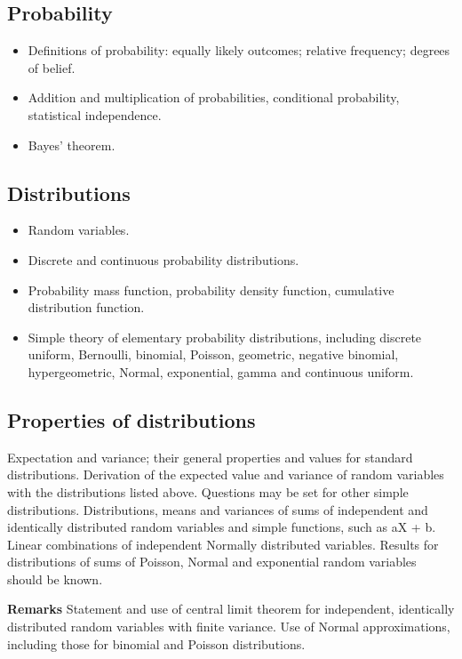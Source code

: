 \subsection*{Probability}
\begin{itemize}
\item Definitions of probability: equally likely outcomes; relative frequency; degrees of belief. 
\item Addition and multiplication of probabilities, conditional probability, statistical independence. 
\item Bayes' theorem.
\end{itemize}
\subsection*{Distributions}

\begin{itemize}
\item Random variables. 
\item Discrete and continuous probability distributions. 
\item Probability mass function, probability density function, cumulative distribution function. 
\item Simple theory of elementary probability distributions, including discrete uniform, Bernoulli, binomial, Poisson, geometric, negative binomial, hypergeometric, Normal, exponential, gamma and continuous uniform.
\end{itemize}
\subsection*{Properties of distributions}
Expectation and variance; their general properties and values for standard distributions.
Derivation of the expected value and variance of random variables with the distributions listed above. Questions may be set for other simple distributions.
Distributions, means and variances of sums of independent and identically distributed random variables and simple functions, such as aX + b. Linear combinations of independent Normally distributed variables.
Results for distributions of sums of Poisson, Normal and exponential random variables should be known.

\textbf{Remarks}
Statement and use of central limit theorem for independent, identically distributed random variables with finite variance.
Use of Normal approximations, including those for binomial and Poisson distributions.

